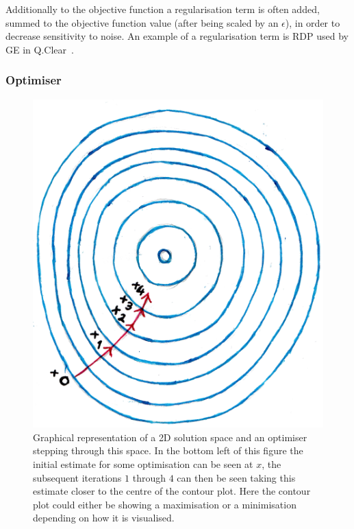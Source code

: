                 Additionally to the objective function a regularisation term is often added, summed to the objective function value (after being scaled by an $\epsilon$), in order to decrease sensitivity to noise. An example of a regularisation term is \gls{RDP} used by \gls{GE} in Q.Clear~.
                
            \subsubsection{Optimiser} \label{sec:optimiser}
                \begin{figure}
                    \centering
                        
                    \includegraphics[width=1.0\linewidth]{figures/background_optimisation.png}
                        
                    \captionsetup{singlelinecheck=false, justification=raggedright}
                    \caption{Graphical representation of a \gls{2D} solution space and an optimiser stepping through this space. In the bottom left of this figure the initial estimate for some optimisation can be seen at $x$, the subsequent iterations $1$ through $4$ can then be seen taking this estimate closer to the centre of the contour plot. Here the contour plot could either be showing a maximisation or a minimisation depending on how it is visualised.} \label{fig:optimiser_optimisation}
                \end{figure}
                
